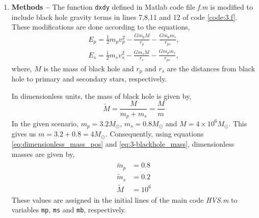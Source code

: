\documentclass[a4paper]{article}
\begin{document}
			\begin{enumerate} [label*=\textbf{(\alph*)}]
	
	
				\item
					\subitem \textbf{Methods  --}
					The function \texttt{dxdy} defined in Matlab code file \emph{f.m} is modified to include black hole gravity terms in lines 7,8,11 and 12 of code \ref{code:3.f}. These modifications are done according to the equations,
					\begin{equation}
						\begin{gathered}
							E_p = \frac{1}{2} m_p v_p^2 - \frac{G m_p M}{r_p} - \frac{G m_p m_s}{r_{ps}}, \\
							E_s = \frac{1}{2} m_s v_s^2 - \frac{G m_s M}{r_s} - \frac{G m_p m_s}{r_{ps}},
						\end{gathered}
					\end{equation}
					where, \(M\) is the mass of black hole and \(r_p\) and \(r_s\) are the distances from black hole to primary and secondary stars, respectively.
					
					\begin{figure}
						
					\end{figure}
					
					In dimensionless units, the mass of black hole is given by,
					\begin{equation}
							\tilde{M} = \frac{M}{m_p+m_s} = \frac{M}{m}
							\label{eq:3-blackhole_mass}
					\end{equation}
					 In the given scenario, \(m_p = 3.2 M_\odot\), \(m_s = 0.8 M_\odot\) and \(M = 4 \times 10^6 M_\odot\). This gives us \(m = 3.2+0.8 = 4 M_\odot\). Consequently, using equations \ref{eq:dimensionless_mass_pos} and \ref{eq:3-blackhole_mass}, dimensionless masses are given by,
					 \begin{equation}
					 	\begin{gathered}
					 		\begin{aligned}
					 			\tilde{m}_p &= 0.8 \\
					 			\tilde{m}_s &= 0.2 \\
					 			\tilde{M} &= 10^6
					 		\end{aligned}
					 	\end{gathered}
				 		\label{eq:3-dimensionless_masses}
					 \end{equation}
					These values are assigned in the initial lines of the main code \emph{HVS.m} to variables \texttt{mp}, \texttt{ms} and \texttt{mb}, respectively.
					

\end{enumerate}
\end{document}
